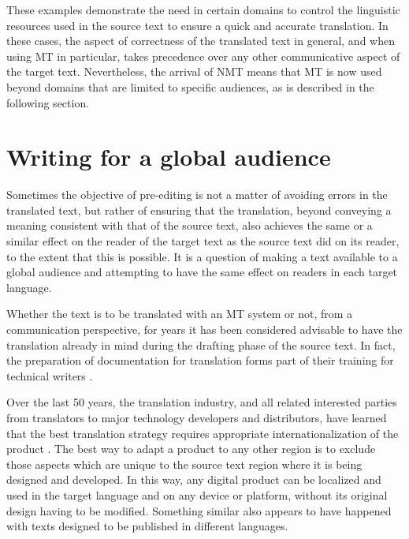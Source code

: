 \documentclass[output=paper,colorlinks,citecolor=brown,
]{langscibook}
\begin{document}
These examples demonstrate the need in certain domains to control the linguistic resources used in the source text to ensure a quick and accurate translation. In these cases, the aspect of correctness of the translated text in general, and when using MT in particular, takes precedence over any other communicative aspect of the target text. Nevertheless, the arrival of NMT means that MT is now used beyond domains that are limited to specific audiences, as is described in the following section.

\section{Writing for a global audience}

Sometimes the objective of pre-editing is not a matter of avoiding errors in the translated text, but rather of ensuring that the translation, beyond conveying a meaning consistent with that of the source text, also achieves the same or a similar effect on the reader of the target text as the source text did on its reader, to the extent that this is possible. It is a question of making a text available to a global audience and attempting to have the same effect on readers in each target language.

Whether the text is to be translated with an MT system or not, from a communication perspective, for years it has been considered advisable to have the translation already in mind during the drafting phase of the source text. In fact, the preparation of documentation for translation forms part of their training for technical writers \citep{Maylath1997}.

\hspace*{-1mm}Over the last 50 years, the translation industry, and all related interested parties from translators to major technology developers and distributors, have learned that the best translation strategy requires appropriate internationalization of the product \citep[14]{Fry2003}. The best way to adapt a product to any other region is to exclude those aspects which are unique to the source text region where it is being designed and developed. In this way, any digital product can be localized and used in the target language and on any device or platform, without its original design having to be modified. Something similar also appears to have happened with texts designed to be published in different languages.
\end{document}

